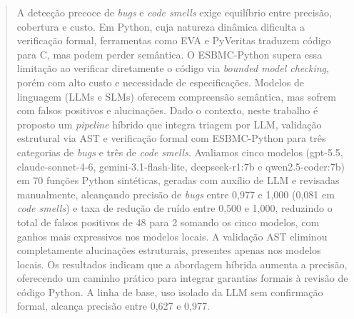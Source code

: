\documentclass[sigconf]{acmart}
\newcommand{\LC}[1]{{\color{red}\textbf{LC:} #1}}
\begin{document}
\begin{abstract}
A detecção precoce de \textit{bugs} e \textit{code smells} exige equilíbrio entre precisão, cobertura e custo. Em Python, cuja natureza dinâmica dificulta a verificação formal, ferramentas como EVA e PyVeritas traduzem código para C, mas podem perder semântica. O ESBMC-Python supera essa limitação ao verificar diretamente o código via \textit{bounded model checking}, porém com alto custo e necessidade de especificações. Modelos de linguagem (LLMs e SLMs) oferecem compreensão semântica, mas sofrem com falsos positivos e alucinações. Dado o contexto, neste trabalho é proposto um \textit{pipeline} híbrido que integra triagem por LLM, validação estrutural via AST e verificação formal com ESBMC-Python para três categorias de \textit{bugs} e três de \textit{code smells}. Avaliamos cinco modelos (gpt-5.5, claude-sonnet-4-6, gemini-3.1-flash-lite, deepseek-r1:7b e qwen2.5-coder:7b) em 70 funções Python sintéticas, geradas com auxílio de LLM e revisadas manualmente, alcançando precisão de \textit{bugs} entre 0,977 e 1,000 (0,081 em \textit{code smells}) e taxa de redução de ruído entre 0,500 e 1,000, reduzindo o total de falsos positivos de 48 para 2 somando os cinco modelos, com ganhos mais expressivos nos modelos locais. A validação AST eliminou completamente alucinações estruturais, presentes apenas nos modelos locais. Os resultados indicam que a abordagem híbrida aumenta a precisão, oferecendo um caminho prático para integrar garantias formais à revisão de código Python. A linha de base, uso isolado da LLM sem confirmação formal, alcança precisão entre 0,627 e 0,977.
\end{abstract}

\end{document}
